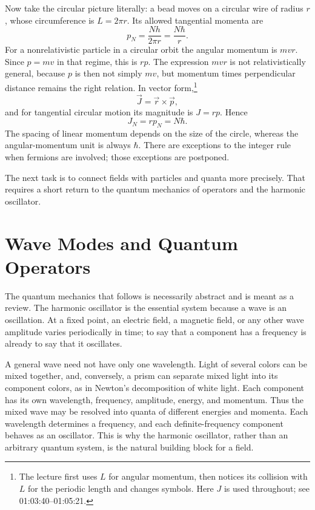 Now take the circular picture literally: a bead moves on a circular wire of radius \(r\), whose circumference is \(L=2\pi r\). Its allowed tangential momenta are
\begin{equation}
p_N=\frac{Nh}{2\pi r}=\frac{N\hbar}{r}.
\end{equation}
For a nonrelativistic particle in a circular orbit the angular momentum is \(mvr\). Since \(p=mv\) in that regime, this is \(rp\). The expression \(mvr\) is not relativistically general, because \(p\) is then not simply \(mv\), but momentum times perpendicular distance remains the right relation. In vector form,\footnote{The lecture first uses \(L\) for angular momentum, then notices its collision with \(L\) for the periodic length and changes symbols. Here \(J\) is used throughout; see 01:03:40--01:05:21.}
\begin{equation}
\vec J=\vec r\times\vec p,
\end{equation}
and for tangential circular motion its magnitude is \(J=rp\). Hence
\begin{equation}
J_N=rp_N=N\hbar.
\end{equation}
The spacing of linear momentum depends on the size of the circle, whereas the angular-momentum unit is always \(\hbar\). There are exceptions to the integer rule when fermions are involved; those exceptions are postponed.

The next task is to connect fields with particles and quanta more precisely. That requires a short return to the quantum mechanics of operators and the harmonic oscillator.

\section{Wave Modes and Quantum Operators}

The quantum mechanics that follows is necessarily abstract and is meant as a review. The harmonic oscillator is the essential system because a wave is an oscillation. At a fixed point, an electric field, a magnetic field, or any other wave amplitude varies periodically in time; to say that a component has a frequency is already to say that it oscillates.

A general wave need not have only one wavelength. Light of several colors can be mixed together, and, conversely, a prism can separate mixed light into its component colors, as in Newton's decomposition of white light. Each component has its own wavelength, frequency, amplitude, energy, and momentum. Thus the mixed wave may be resolved into quanta of different energies and momenta. Each wavelength determines a frequency, and each definite-frequency component behaves as an oscillator. This is why the harmonic oscillator, rather than an arbitrary quantum system, is the natural building block for a field.

